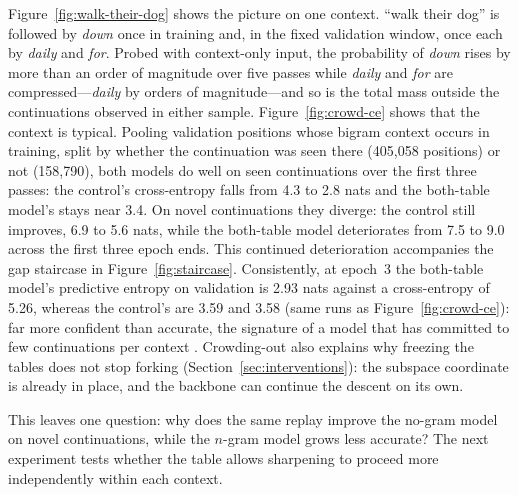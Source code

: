 Figure~\ref{fig:walk-their-dog} shows the picture on one context. ``walk their dog'' is followed by \emph{down} once in training and, in the fixed validation window, once each by \emph{daily} and \emph{for}. Probed with context-only input, the probability of \emph{down} rises by more than an order of magnitude over five passes while \emph{daily} and \emph{for} are compressed---\emph{daily} by orders of magnitude---and so is the total mass outside the continuations observed in either sample. Figure~\ref{fig:crowd-ce} shows that the context is typical. Pooling validation positions whose bigram context occurs in training, split by whether the continuation was seen there (405{,}058 positions) or not (158{,}790), both models do well on seen continuations over the first three passes: the control's cross-entropy falls from 4.3 to 2.8 nats and the both-table model's stays near 3.4. On novel continuations they diverge: the control still improves, 6.9 to 5.6 nats, while the both-table model deteriorates from 7.5 to 9.0 across the first three epoch ends. This continued deterioration accompanies the gap staircase in Figure~\ref{fig:staircase}. Consistently, at epoch~3 the both-table model's predictive entropy on validation is 2.93 nats against a cross-entropy of 5.26, whereas the control's are 3.59 and 3.58 (same runs as Figure~\ref{fig:crowd-ce}): far more confident than accurate, the signature of a model that has committed to few continuations per context \citep{carlsson2025hyperfitting}. Crowding-out also explains why freezing the tables does not stop forking (Section~\ref{sec:interventions}): the subspace coordinate is already in place, and the backbone can continue the descent on its own.

This leaves one question: why does the same replay improve the no-gram model on novel continuations, while the $n$-gram model grows less accurate? The next experiment tests whether the table allows sharpening to proceed more independently within each context.

